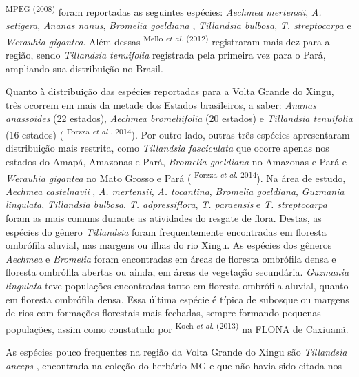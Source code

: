 \begin{multicols}{2}
\textsuperscript{MPEG (\allowbreak{}2008)\allowbreak{}} foram reportadas as seguintes espécies:\allowbreak{} \textit{Aechmea mertensii},\allowbreak{} \textit{A.\allowbreak{} setigera},\allowbreak{} \textit{Ananas nanus},\allowbreak{} \textit{Bromelia goeldiana },\allowbreak{} \textit{Tillandsia bulbosa},\allowbreak{} \textit{T.\allowbreak{} streptocarpa} e \textit{Werauhia gigantea}.\allowbreak{} Além dessas \textsuperscript{Mello \textit{et al.\allowbreak{}} (\allowbreak{}2012)\allowbreak{}} registraram mais dez para a região,\allowbreak{} sendo \textit{Tillandsia tenuifolia} registrada pela primeira vez para o Pará,\allowbreak{} ampliando sua distribuição no Brasil.\allowbreak{}\par{}Quanto à distribuição das espécies reportadas para a Volta Grande do Xingu,\allowbreak{} três ocorrem em mais da metade dos Estados brasileiros,\allowbreak{} a saber:\allowbreak{} \textit{Ananas anassoides} (\allowbreak{}22 estados)\allowbreak{},\allowbreak{} \textit{Aechmea bromeliifolia} (\allowbreak{}20 estados)\allowbreak{} e \textit{Tillandsia tenuifolia } (\allowbreak{}16 estados)\allowbreak{} (\allowbreak{} \textsuperscript{Forzza \textit{et al }.\allowbreak{} 2014})\allowbreak{}.\allowbreak{} Por outro lado,\allowbreak{} outras três espécies apresentaram distribuição mais restrita,\allowbreak{} como \textit{Tillandsia fasciculata} que ocorre apenas nos estados do Amapá,\allowbreak{} Amazonas e Pará,\allowbreak{} \textit{Bromelia goeldiana} no Amazonas e Pará e \textit{Werauhia gigantea} no Mato Grosso e Pará (\allowbreak{} \textsuperscript{Forzza \textit{et al.\allowbreak{}} 2014})\allowbreak{}.\allowbreak{} Na área de estudo,\allowbreak{} \textit{Aechmea castelnavii },\allowbreak{} \textit{A.\allowbreak{} mertensii},\allowbreak{} \textit{A.\allowbreak{} tocantina},\allowbreak{} \textit{Bromelia goeldiana},\allowbreak{} \textit{Guzmania lingulata},\allowbreak{} \textit{Tillandsia bulbosa},\allowbreak{} \textit{T.\allowbreak{} adpressiflora},\allowbreak{} \textit{T.\allowbreak{} paraensis } e \textit{T.\allowbreak{} streptocarpa} foram as mais comuns durante as atividades do resgate de flora.\allowbreak{} Destas,\allowbreak{} as espécies do gênero \textit{Tillandsia} foram frequentemente encontradas em floresta ombrófila aluvial,\allowbreak{} nas margens ou ilhas do rio Xingu.\allowbreak{} As espécies dos gêneros \textit{Aechmea} e \textit{Bromelia} foram encontradas em áreas de floresta ombrófila densa e floresta ombrófila abertas ou ainda,\allowbreak{} em áreas de vegetação secundária.\allowbreak{} \textit{Guzmania lingulata} teve populações encontradas tanto em floresta ombrófila aluvial,\allowbreak{} quanto em floresta ombrófila densa.\allowbreak{} Essa última espécie é típica de subosque ou margens de rios com formações florestais mais fechadas,\allowbreak{} sempre formando pequenas populações,\allowbreak{} assim como constatado por \textsuperscript{Koch \textit{et al}.\allowbreak{} (\allowbreak{}2013)\allowbreak{}} na FLONA de Caxiuanã.\allowbreak{} \par{}As espécies pouco frequentes na região da Volta Grande do Xingu são \textit{Tillandsia anceps },\allowbreak{} encontrada na coleção do herbário MG e que não havia sido citada nos 
\end{multicols}
